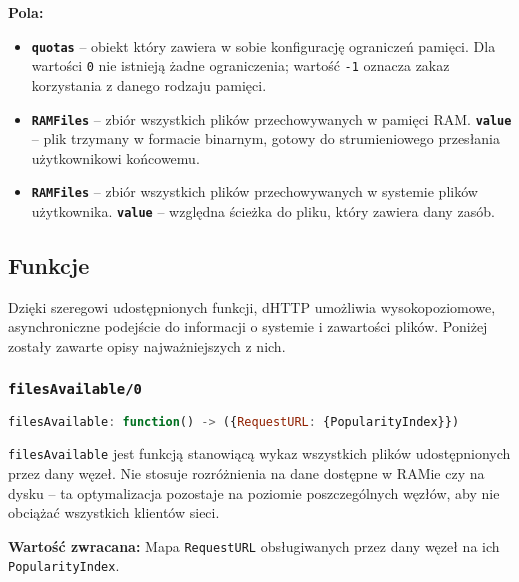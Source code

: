 \textbf{Pola:}
\begin{itemize}
    \item \textbf{\texttt{quotas}} -- obiekt który zawiera w sobie konfigurację ograniczeń pamięci. Dla wartości \texttt{0} nie istnieją żadne ograniczenia; wartość \texttt{-1} oznacza zakaz korzystania z danego rodzaju pamięci.
    \item \textbf{\texttt{RAMFiles}} -- zbiór wszystkich plików przechowywanych w pamięci RAM.
    \subitem  \textbf{\texttt{value}} -- plik trzymany w formacie binarnym, gotowy do strumieniowego przesłania użytkownikowi końcowemu.
    \item \textbf{\texttt{RAMFiles}} -- zbiór wszystkich plików przechowywanych w systemie plików użytkownika.
    \subitem  \textbf{\texttt{value}} -- względna ścieżka do pliku, który zawiera dany zasób.
\end{itemize}



\subsection{Funkcje}
\label{sub:functions}

Dzięki szeregowi udostępnionych funkcji, dHTTP umożliwia wysokopoziomowe, asynchroniczne podejście do informacji o systemie i zawartości plików. Poniżej zostały zawarte opisy najważniejszych z nich.

\subsubsection{\texttt{filesAvailable/0}}
\begin{lstlisting}[language=javascript]
    filesAvailable: function() -> ({RequestURL: {PopularityIndex}})
\end{lstlisting}
\texttt{filesAvailable} jest funkcją stanowiącą wykaz wszystkich plików udostępnionych przez dany węzeł. Nie stosuje rozróżnienia na dane dostępne w RAMie czy na dysku -- ta optymalizacja pozostaje na poziomie poszczególnych węzłów, aby nie obciążać wszystkich klientów sieci.

\textbf{Wartość zwracana:}
Mapa \texttt{RequestURL} obsługiwanych przez dany węzeł na ich \texttt{PopularityIndex}.



